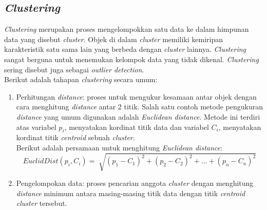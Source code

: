 \subsection{\textit{Clustering}} 
{\it Clustering} merupakan proses mengelompokkan satu data ke dalam himpunan data yang disebut {\it cluster}. Objek di dalam {\it cluster} memiliki kemiripan karakteristik satu sama lain yang berbeda dengan {\it cluster} lainnya. {\it Clustering} sangat berguna untuk menemukan kelompok data yang tidak dikenal. {\it Clustering} sering disebut juga sebagai {\it outlier detection}. \\

\noindent Berikut adalah tahapan {\it clustering} secara umum:
\begin{enumerate}
\item Perhitungan \textit{distance}: proses untuk mengukur kesamaan antar objek dengan cara menghitung \textit{distance} antar 2 titik. Salah satu contoh metode pengukuran \textit{distance} yang umum digunakan adalah {\it Euclidean distance}. Metode ini terdiri atas variabel $p_i$, menyatakan kordinat titik data dan variabel $C_i$, menyatakan kordinat titik \textit{centroid} sebuah \textit{cluster}.\\

\noindent Berikut adalah persamaan untuk menghitung \textit{Euclidean distance}:
\begin{equation}
EuclidDist(p_i,C_i) = \sqrt[]{(p_1-C_1)^2+(p_2-C_2)^2+\ldots +(p_n-C_n)^2}
\end{equation}

\item Pengelompokan data: proses pencarian anggota \textit{cluster} dengan menghitung \textit{distance} minimum antara masing-masing titik data dengan titik \textit{centroid cluster} tersebut.
\end{enumerate}
\vspace{0.3cm}

